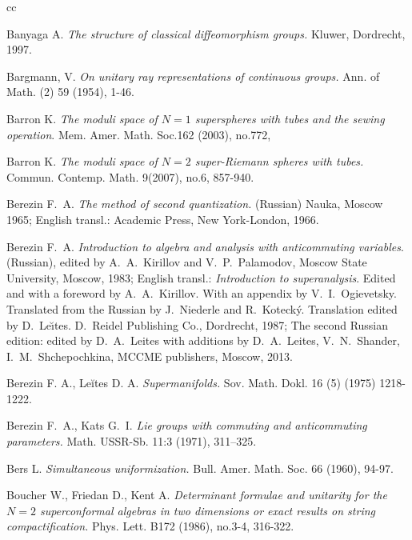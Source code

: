 \documentclass[]{amsart}
\newcounter{sec}
\begin{document}
\begin{thebibliography}{cc}
	
	Banyaga A.
{\it 	The structure of classical diffeomorphism groups.}
	Kluwer, Dordrecht, 1997.

Bargmann, V.
{\it On unitary ray representations of continuous groups.} Ann. of Math. (2) 59 (1954), 1-46.

Barron K.
{\it The moduli space of $N=1$ superspheres with tubes and the sewing operation}. Mem. Amer. Math. Soc.162 (2003), no.772,

Barron K.
{\it The moduli space of $N=2$ super-Riemann spheres with tubes.}
 Commun. Contemp. Math. 9(2007), no.6, 857-940.


Berezin F.~A. {\it The method of second quantization.} (Russian)
Nauka, Moscow 1965; English transl.:
 Academic Press, New York-London, 1966.
 
Berezin F.~A.
 {\it Introduction to algebra and analysis with anticommuting variables}.
 (Russian), edited by A.~A.~Kirillov and V.~P.~Palamodov, Moscow State University, Moscow, 1983; English transl.:
{\it Introduction to superanalysis}.
Edited and with a foreword by A.~A.~Kirillov. With an appendix by V.~I.~Ogievetsky. Translated from the Russian by J.~Niederle and R.~Koteck\'y. Translation edited by D.~Le\u\i tes.  D.~Reidel Publishing Co., Dordrecht, 1987;
The second Russian edition: edited by D.~A.~Leites with additions by D.~A.~Leites,
V.~N.~Shander, I.~M.~Shchepochkina, MCCME publishers, Moscow, 2013.

 Berezin F. A., Leĭtes D. A.
{\it  Supermanifolds.}
 Sov. Math. Dokl. 16 (5) (1975) 1218-1222.

Berezin F.~A., Kats G.~I.
{\it Lie groups with commuting and anticommuting parameters.}
 Math. USSR-Sb. 11:3 (1971), 311--325.
 

 
Bers L.
{\it Simultaneous uniformization.}
Bull. Amer. Math. Soc. 66 (1960), 94-97.
 
 
 Boucher W., Friedan D., Kent A.
{\it Determinant formulae and unitarity for the $N=2$ superconformal algebras in two dimensions or exact results on string compactification.} Phys. Lett. B172 (1986), no.3-4, 316-322.
 

\end{thebibliography}
\end{document}

